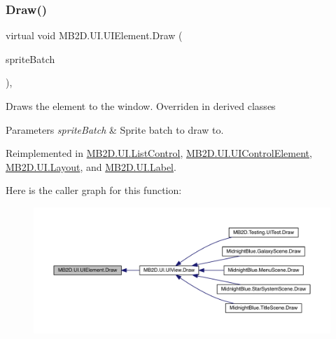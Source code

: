 \subsubsection{\texorpdfstring{Draw()}{Draw()}}
{\footnotesize\ttfamily virtual void M\+B2\+D.\+U\+I.\+U\+I\+Element.\+Draw (\begin{DoxyParamCaption}\item[{Sprite\+Batch}]{sprite\+Batch }\end{DoxyParamCaption})\hspace{0.3cm}{\ttfamily [inline]}, {\ttfamily [virtual]}}



Draws the element to the window. Overriden in derived classes 


\begin{DoxyParams}{Parameters}
{\em sprite\+Batch} & Sprite batch to draw to.\\
\hline
\end{DoxyParams}


Reimplemented in \hyperlink{class_m_b2_d_1_1_u_i_1_1_list_control_a2ec92a77d8960945f3bd37bd76641946}{M\+B2\+D.\+U\+I.\+List\+Control}, \hyperlink{class_m_b2_d_1_1_u_i_1_1_u_i_control_element_afac0cbbbbead7c7348401075cda433ba}{M\+B2\+D.\+U\+I.\+U\+I\+Control\+Element}, \hyperlink{class_m_b2_d_1_1_u_i_1_1_layout_ae018eee922839254b46610216843afa7}{M\+B2\+D.\+U\+I.\+Layout}, and \hyperlink{class_m_b2_d_1_1_u_i_1_1_label_a976ec212cedf0710fb35cd578e1e51b1}{M\+B2\+D.\+U\+I.\+Label}.

Here is the caller graph for this function\+:\nopagebreak
\begin{figure}[H]
\begin{center}
\leavevmode
\includegraphics[width=350pt]{class_m_b2_d_1_1_u_i_1_1_u_i_element_afec98e6e38cb0dbc17a5db6d6a3d5ba5_icgraph}
\end{center}
\end{figure}
\hypertarget{class_m_b2_d_1_1_u_i_1_1_u_i_element_a0a17b121a60ad05039f01eee006ae76c}{}\label{class_m_b2_d_1_1_u_i_1_1_u_i_element_a0a17b121a60ad05039f01eee006ae76c} 
